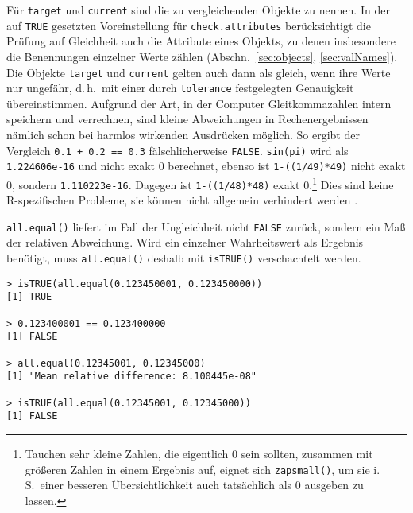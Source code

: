 Für \lstinline!target! und \lstinline!current! sind die zu vergleichenden Objekte zu nennen. In der auf \lstinline!TRUE! gesetzten Voreinstellung für \lstinline!check.attributes! berücksichtigt die Prüfung auf Gleichheit auch die Attribute eines Objekts, zu denen insbesondere die Benennungen einzelner Werte zählen (Abschn.\ \ref{sec:objects}, \ref{sec:valNames}). Die Objekte \lstinline!target! und \lstinline!current! gelten auch dann als gleich, wenn ihre Werte nur ungefähr, d.\,h.\ mit einer durch \lstinline!tolerance! festgelegten Genauigkeit übereinstimmen. Aufgrund der Art, in der Computer Gleitkommazahlen intern speichern und verrechnen, sind kleine Abweichungen in Rechenergebnissen nämlich schon bei harmlos wirkenden Ausdrücken möglich. So ergibt der Vergleich \lstinline!0.1 + 0.2 == 0.3! fälschlicherweise \lstinline!FALSE!. \lstinline!sin(pi)! wird als \lstinline!1.224606e-16! und nicht exakt $0$ berechnet, ebenso ist \lstinline!1-((1/49)*49)! nicht exakt $0$, sondern \lstinline!1.110223e-16!. Dagegen ist \lstinline!1-((1/48)*48)! exakt $0$.\footnote{\label{ftn:floatingPoint}Tauchen sehr kleine Zahlen, die eigentlich $0$ sein sollten, zusammen mit größeren Zahlen in einem Ergebnis auf, eignet sich \lstinline!zapsmall()!, um sie i.\,S.\ einer besseren Übersichtlichkeit auch tatsächlich als $0$ ausgeben zu lassen.} Dies sind keine R-spezifischen Probleme, sie können nicht allgemein verhindert werden \cite{Cowlishaw2008, Goldberg1991}.

\lstinline!all.equal()! liefert im Fall der Ungleichheit nicht \lstinline!FALSE! zurück, sondern ein Maß der relativen Abweichung. Wird ein einzelner Wahrheitswert als Ergebnis benötigt, muss \lstinline!all.equal()! deshalb mit \lstinline!isTRUE()! verschachtelt werden.
\begin{lstlisting}
> isTRUE(all.equal(0.123450001, 0.123450000))
[1] TRUE

> 0.123400001 == 0.123400000
[1] FALSE

> all.equal(0.12345001, 0.12345000)
[1] "Mean relative difference: 8.100445e-08"

> isTRUE(all.equal(0.12345001, 0.12345000))
[1] FALSE
\end{lstlisting}
